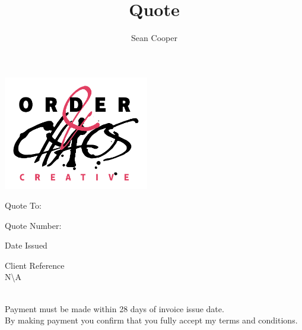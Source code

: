\documentclass[11pt,a4paper]{letter}
\author{Sean Cooper}
\title{Quote}
\begin{document}
    \begin{center}
        \includegraphics[width=180pt]{oacc-logo-web-01.png}
    \end{center}
    \vspace{68pt}
    \begin{minipage}[t]{0.3115\textwidth}
    {\semibold Quote To:}
        \\
    \end{minipage}\hspace{12pt}
    \begin{minipage}[t]{0.3115\textwidth}
        \setlength{\parskip}{1em}
        {\semibold Quote Number:}\\
        \par
        {\semibold Date Issued}\\
    \end{minipage}\hspace{12pt}
    \begin{minipage}[t]{0.3115\textwidth}
    {\semibold Client Reference}
        \\
        N\textbackslash A
    \end{minipage}
    \\
    \fontsize{9pt}{11pt}\selectfont
    {\semibold Payment must be made within 28 days of invoice issue date.}\\
    By making payment you confirm that you fully accept my terms and conditions.\par
\end{document}
